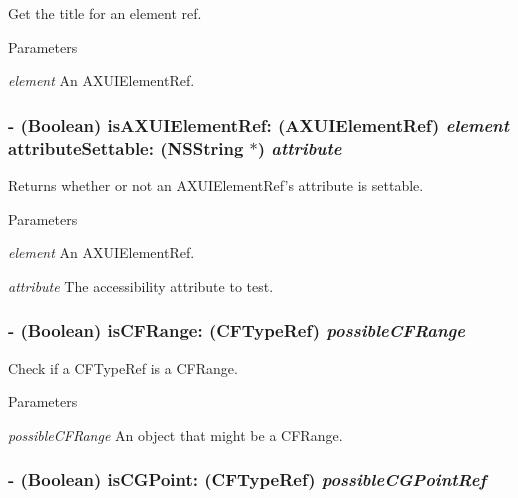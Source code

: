 Get the title for an element ref. 
\begin{DoxyParams}{Parameters}
\item[{\em element}]An AXUIElementRef. \end{DoxyParams}
\hypertarget{interface_g_d_accessibility_manager_ac28b17f1ec344fc9edb3de8c0a05b40f}{
\subsubsection[{isAXUIElementRef:attributeSettable:}]{\setlength{\rightskip}{0pt plus 5cm}-\/ (Boolean) isAXUIElementRef: (AXUIElementRef) {\em element}\/ attributeSettable: ({\bf NSString} $\ast$) {\em attribute}}}
\label{interface_g_d_accessibility_manager_ac28b17f1ec344fc9edb3de8c0a05b40f}


Returns whether or not an AXUIElementRef's attribute is settable. 
\begin{DoxyParams}{Parameters}
\item[{\em element}]An AXUIElementRef. \item[{\em attribute}]The accessibility attribute to test. \end{DoxyParams}
\hypertarget{interface_g_d_accessibility_manager_ac7682be7c9d421b3b6aff5bd0427c484}{
\subsubsection[{isCFRange:}]{\setlength{\rightskip}{0pt plus 5cm}-\/ (Boolean) isCFRange: (CFTypeRef) {\em possibleCFRange}}}
\label{interface_g_d_accessibility_manager_ac7682be7c9d421b3b6aff5bd0427c484}


Check if a CFTypeRef is a CFRange. 
\begin{DoxyParams}{Parameters}
\item[{\em possibleCFRange}]An object that might be a CFRange. \end{DoxyParams}
\hypertarget{interface_g_d_accessibility_manager_a76393da95b202ecff6dd43e663539b62}{
\subsubsection[{isCGPoint:}]{\setlength{\rightskip}{0pt plus 5cm}-\/ (Boolean) isCGPoint: (CFTypeRef) {\em possibleCGPointRef}}}
\label{interface_g_d_accessibility_manager_a76393da95b202ecff6dd43e663539b62}


